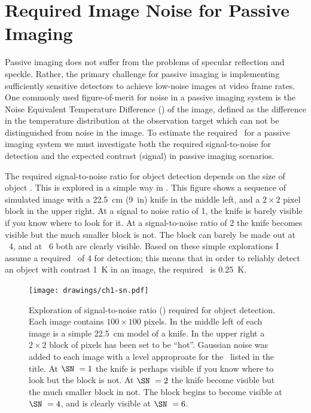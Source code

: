 \section{Required Image Noise for Passive Imaging}

Passive imaging does not suffer from the problems of specular reflection and speckle.
Rather, the primary challenge for passive imaging is implementing sufficiently sensitive detectors to achieve low-noise images at video frame rates.
One commonly used figure-of-merit for noise in a passive imaging system is the Noise Equivalent Temperature Difference (\NETD) of the image, defined as the difference in the temperature distribution at the observation target which can not be distinguished from noise in the image.
To estimate the required \NETD\ for a passive imaging system we must investigate both the required signal-to-noise for detection and the expected contrast (signal) in passive imaging scenarios.

The required signal-to-noise ratio for object detection depends on the size of object \cite{steven_w._smith_scientist_1997}.
This is explored in a simple way in .
This figure shows a sequence of simulated image with a \SI{22.5}{\cm} (\SI{9}{in}) knife in the middle left, and a $2\times2$ pixel block in the upper right.
At a signal to noise ratio of 1, the knife is barely visible if you know where to look for it.
At a signal-to-noise ratio of 2 the knife becomes visible but the much smaller block is not.
The block can barely be made out at \SN\  4, and at \SN\  6 both are clearly visible.
Based on these simple explorations I assume a required \SN\  of 4 for detection; this means that in order to reliably detect an object with contrast \SI{1}{\K} in an image, the required \NETD\ is \SI{0.25}{\K}.

\begin{figure}
\centering
\texttt{[image: drawings/ch1-sn.pdf]}
\caption[xxx]{
  Exploration of signal-to-noise ratio (\SN) required for object detection.
  Each image contains $100 \times 100$ pixels.
  In the middle left of each image is a simple \SI{22.5}{\cm} model of a knife.
  In the upper right a $2\times2$ block of pixels has been set to be ``hot''.
  Gaussian noise was added to each image with a level approproate for the \SN\ listed in the title.
  At $\SN\ = 1$ the knife is perhaps visible if you know where to look but the block is not.
  At $\SN\ = 2$ the knife become visible but the much smaller block in not.
  The block begins to become visible at $\SN\ = 4$, and is clearly visible at $\SN\ = 6$.
}
\label{fig:ch1-sn}
\end{figure}


